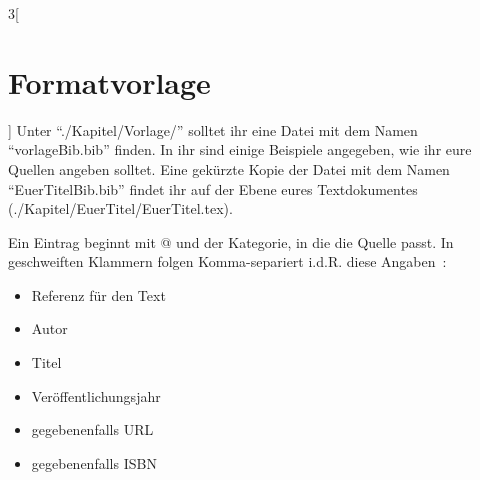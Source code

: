 \begin{multicols}{3}[\section{Formatvorlage}]
Unter \enquote{./Kapitel/Vorlage/} solltet ihr eine Datei mit dem Namen \enquote{vorlageBib.bib} finden. In ihr sind einige Beispiele angegeben, wie ihr eure Quellen angeben solltet. Eine gekürzte Kopie der Datei mit dem Namen \enquote{EuerTitelBib.bib} findet ihr auf der Ebene eures Textdokumentes (./Kapitel/EuerTitel/EuerTitel.tex).

Ein Eintrag beginnt mit @ und der Kategorie, in die die Quelle passt. In geschweiften Klammern folgen Komma-separiert i.d.R. diese Angaben~\cite{vorlage.2}:

\begin{itemize}
	\item Referenz für den Text
	\item Autor 
	\item Titel
	\item Veröffentlichungsjahr
	\item gegebenenfalls URL
	\item gegebenenfalls ISBN
\end{itemize}

\end{multicols}
\newpage
